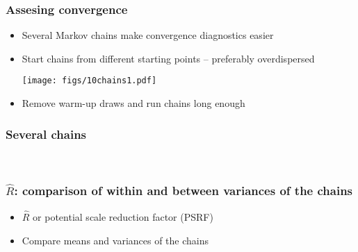 \documentclass[10pt]{beamer}
\begin{document}
\begin{frame}

\frametitle{Assesing convergence}

  \vspace{-0.5\baselineskip}
  \begin{itemize}
  \item Several Markov chains make convergence diagnostics easier
  \pause
    \item Start chains from different starting points -- preferably overdispersed
      \begin{center}
  \vspace{-0.5\baselineskip}
      \texttt{[image: figs/10chains1.pdf]}
    \end{center}
  \vspace{-0.5\baselineskip}
    \item<2-> Remove warm-up draws and run chains long enough
  \end{itemize}

\end{frame}

\begin{frame}

\frametitle{Several chains}

      \begin{center}
      \\
    \end{center}

\end{frame}



\begin{frame}[fragile]

\frametitle{ $\widehat{R}$: comparison of within and between variances of the chains}

  \begin{itemize}
  \item $\widehat{R}$ or {\color{uured} potential scale reduction factor} (PSRF)
  \item Compare means and variances of the chains\\
    \vspace{1\baselineskip}
  \end{itemize}

\end{frame}
\end{document}
